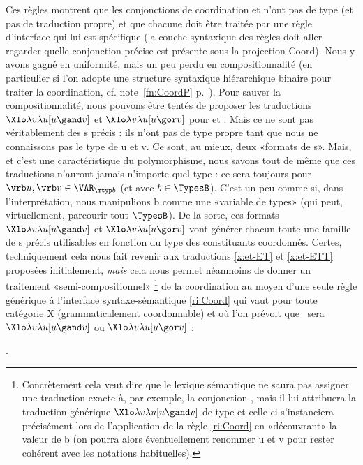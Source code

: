 Ces règles montrent que les conjonctions de coordination  et  n'ont pas de type (et pas de traduction propre) et que chacune doit être traitée par une règle d'interface qui lui est spécifique (la couche syntaxique des règles doit aller regarder quelle conjonction précise est présente sous la projection Coord).  Nous y avons gagné en uniformité, mais un peu perdu en compositionnalité (en particulier si l'on adopte une structure syntaxique hiérarchique binaire pour traiter la coordination, cf. note~\ref{fn:CoordP} p.~\pageref{fn:CoordP}).
Pour sauver la compositionnalité, nous pouvons être tentés de proposer les traductions $\Xlo\lambda v\lambda u[u\gand v]$ et $\Xlo\lambda v\lambda u[u\gor v]$ pour  et .  Mais ce ne sont pas véritablement des \lterme s précis : ils n'ont pas de type propre tant que nous ne connaissons pas le type de \vrb u et \vrb v.  Ce sont, au mieux, deux «formats de \lterme s».
Mais, et c'est une caractéristique du polymorphisme, nous savons tout de même que ces traductions n'auront jamais n'importe quel type : ce sera toujours  pour $\vrb u, \vrb v \in \VAR_{\mtyp b}$ (et avec $b\in\TypesB$). 
C'est un peu comme si, dans l'interprétation, nous manipulions \mtyp b comme une «variable de types» (qui peut, virtuellement, parcourir tout $\TypesB$). 
De la sorte, ces formats $\Xlo\lambda v\lambda u[u\gand v]$ et $\Xlo\lambda v\lambda u[u\gor v]$ vont générer chacun toute une famille de \lterme s précis utilisables en fonction du type des constituants coordonnés.  Certes, techniquement cela nous fait revenir aux traductions \ref{x:et-ET} et \ref{x:et-ETT} proposées initialement, \emph{mais} cela nous permet néanmoins de donner un traitement «semi-compositionnel»%
\footnote{Concrètement cela veut dire que le lexique sémantique ne saura pas assigner une traduction exacte à, par exemple, la conjonction , mais il lui attribuera la traduction générique $\Xlo\lambda v\lambda u[u\gand v]$ de type  et celle-ci s'instanciera précisément lors de l'application de la règle \ref{ri:Coord} en «découvrant» la valeur de \mtyp b (on pourra alors éventuellement renommer \vrb u et \vrb v pour rester cohérent avec les notations habituelles).}
de la coordination au moyen d'une seule règle générique à l'interface syntaxe-sémantique \ref{ri:Coord} qui vaut pour toute catégorie X (grammaticalement coordonnable) et où l'on prévoit que \vrb\gamma\ sera $\Xlo\lambda v\lambda u[u\gand v]$ ou $\Xlo\lambda v\lambda u[u\gor v]$ :


\ex.
\label{ri:Coord}


